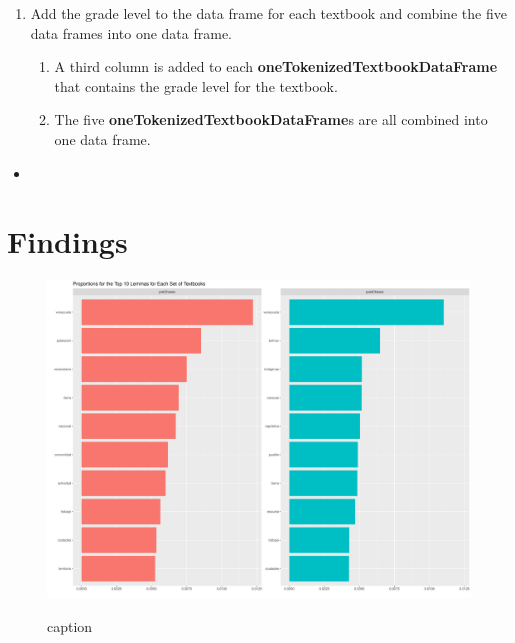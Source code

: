 \documentclass[12]{article}
\begin{document}
\begin{enumerate}
\item Add the grade level to the data frame for each textbook and combine the five data frames into one data frame.

	\begin{enumerate}
	
	\item A third column is added to each \textbf{oneTokenizedTextbookDataFrame} that contains the grade level for the textbook. 
	
	\item The five \textbf{oneTokenizedTextbookDataFrame}s are all combined into one data frame. 
	
	\end{enumerate}


\end{enumerate}



\begin{itemize}
	\item 
\end{itemize}



\section{Findings}



\begin{figure}[h!]
  \centering
  \includegraphics[width=4.5in]{images/top10AllLemmasProp}\\
  \caption{caption}
\end{figure}






\newpage


\end{document}
